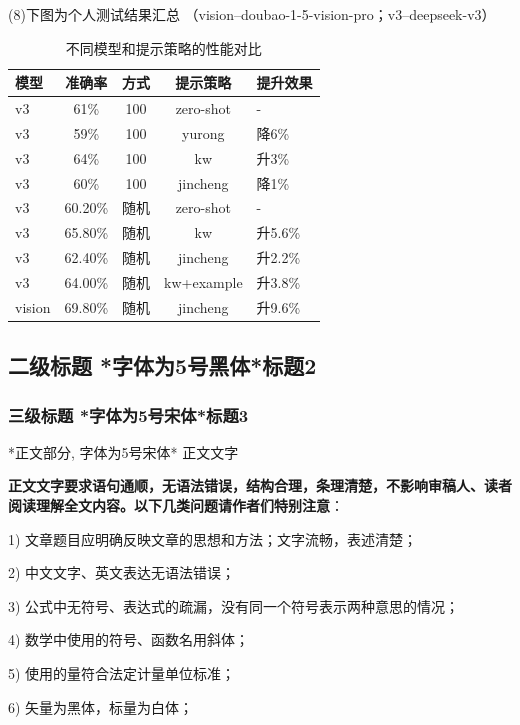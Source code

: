\documentclass[10.5pt,compsoc]{CjC}
\theoremstyle{mystyle}
\begin{document}
\begin{CJK*}{UTF8}{song}
(8)下图为个人测试结果汇总
（vision--doubao-1-5-vision-pro；v3--deepseek-v3）
\begin{table}[h]   
\centering   
\caption{不同模型和提示策略的性能对比}   
\begin{tabular}{|l|c|c|c|l|}   
\hline   
模型 & 准确率 & 方式 & 提示策略 & 提升效果 \\    
\hline   
v3 & 61\%    & 100  & zero-shot         & -       \\   
v3 & 59\%    & 100  & yurong     & 降6\%  \\   
v3 & 64\%    & 100  & kw         & 升3\%  \\   
v3 & 60\%    & 100  & jincheng   & 降1\%  \\ \hline   
v3 & 60.20\% & 随机 & zero-shot         & -             \\   
v3 & 65.80\% & 随机& kw         & 升5.6\%        \\   
v3 & 62.40\% & 随机 & jincheng   & 升2.2\%        \\   
v3 & 64.00\% & 随机& kw+example & 升3.8\%        \\ \hline   
vision & 69.80\% & 随机 & jincheng   & 升9.6\%        \\
\hline
\end{tabular}
\end{table}


{\begin{CJK*}{UTF8}{zhhei}\subsection{二级标题 *字体为5号黑体*标题2}\end{CJK*}}
\subsubsection{三级标题 *字体为5号宋体*标题3}
*正文部分, 字体为5号宋体* 正文文字

\textbf{正文文字要求语句通顺，无语法错误，结构合理，条理清楚，不影响审稿人、读者阅读理解全文内容。以下几类问题请作者们特别注意}：

1) 文章题目应明确反映文章的思想和方法；文字流畅，表述清楚；

2) 中文文字、英文表达无语法错误；

3) 公式中无符号、表达式的疏漏，没有同一个符号表示两种意思的情况；

4) 数学中使用的符号、函数名用斜体；

5) 使用的量符合法定计量单位标准；

6) 矢量为黑体，标量为白体；


\end{CJK*}
\end{document}
